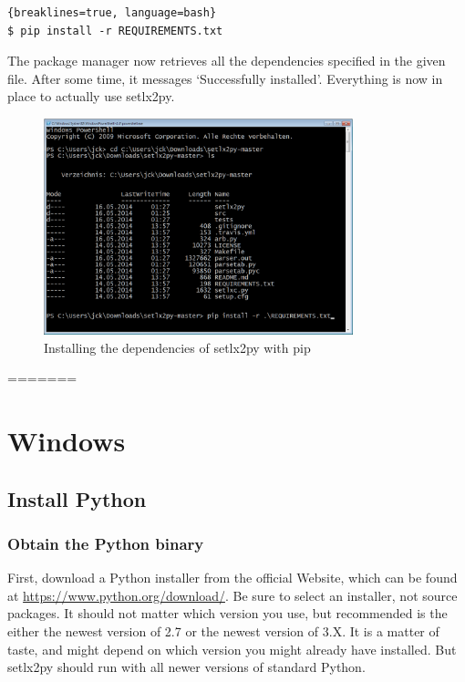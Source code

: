 \begin{lstlisting}{breaklines=true, language=bash}
$ pip install -r REQUIREMENTS.txt
\end{lstlisting}

The package manager now retrieves all the dependencies specified in the given file. After some time, it messages `Successfully installed'. Everything is now in place to actually use setlx2py.

\begin{figure}[ht]
    \centering
    \includegraphics[width=0.8\textwidth]{img/install-reqs.png}
    \caption{Installing the dependencies of setlx2py with pip}
    \label{fig:install-req}
\end{figure}
=======
\section{Windows}

\subsection{Install Python}

\subsubsection{Obtain the Python binary}

First, download a Python installer from the official Website, which can be found at \url{https://www.python.org/download/}. Be sure to select an installer, not source packages. It should not matter which version you use, but recommended is the either the newest version of 2.7 or the newest version of 3.X. It is a matter of taste, and might depend on which version you might already have installed. But setlx2py should run with all newer versions of standard Python.

